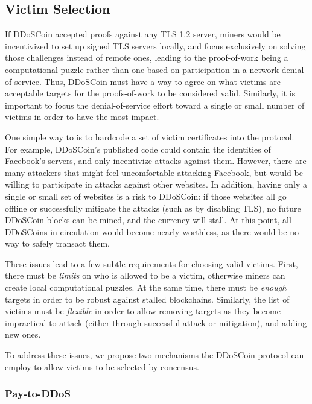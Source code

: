 \subsection{Victim Selection}
\label{sec:victim}

If DDoSCoin accepted proofs against any TLS 1.2 server, miners would be
incentivized to set up signed TLS servers locally, and focus exclusively on
solving those challenges instead of remote ones, leading to the
proof-of-work being a computational puzzle rather than one based on
participation in a network denial of service. Thus, DDoSCoin must have a way to
agree on what victims are acceptable targets for the proofs-of-work to be considered
valid. Similarly, it is important to focus the denial-of-service effort toward a
single or small number of victims in order to have the most impact.

One simple way to is to hardcode a set of victim certificates into the protocol.
For example, DDoSCoin's published code could contain the identities of
Facebook's servers, and only incentivize attacks against them. However, there
are many attackers that might feel uncomfortable attacking Facebook, but would
be willing to participate in attacks against other websites. In addition, having
only a single or small set of websites is a risk to DDoSCoin: if those websites
all go offline or successfully mitigate the attacks (such as by disabling TLS),
no future DDoSCoin blocks can be mined, and the currency will stall. At this
point, all DDoSCoins in circulation would become nearly worthless, as there
would be no way to safely transact them.

These issues lead to a few subtle requirements for choosing valid victims.
First, there must be \emph{limits} on who is allowed to be a victim, otherwise
miners can create local computational puzzles. At the same time, there must be
\emph{enough} targets in order to be robust against stalled blockchains.
Similarly, the list of victims must be \emph{flexible} in order to allow
removing targets as they become impractical to attack (either
through successful attack or mitigation), and adding new ones.

To address these issues, we propose two mechanisms the DDoSCoin protocol can
employ to allow victims to be selected by concensus.


\subsubsection{Pay-to-DDoS}

